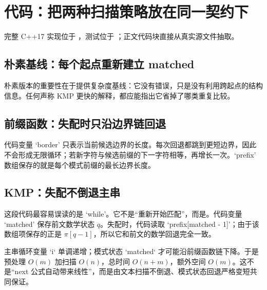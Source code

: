 \documentclass[UTF8,fontset=none,11pt,a4paper]{ctexart}
\begin{document}
\section{代码：把两种扫描策略放在同一契约下}
完整 C++17 实现位于 ，测试位于 ；正文代码块直接从真实源文件抽取。

\subsection{朴素基线：每个起点重新建立 matched}


朴素版本的重要性在于提供复杂度基线：它没有错误，只是没有利用跨起点的结构信息。任何声称 KMP 更快的解释，都应能指出它省掉了哪类重复比较。

\subsection{前缀函数：失配时只沿边界链回退}


代码变量 `border' 只表示当前候选边界的长度。每次回退都跳到更短边界，因此不会形成无限循环；若新字符与候选前缀的下一字符相等，再增长一次。`prefix' 数组保存的就是每个模式前缀的最长边界长度。

\subsection{KMP：失配不倒退主串}


这段代码最容易误读的是 `while'。它不是“重新开始匹配”，而是。代码变量 `matched' 保存前文数学状态 $q$。失配时，代码读取 `prefix[matched - 1]'；由于该数组项保存的正是 $\pi[q-1]$，所以它和前文的数学回退完全一致。

主串循环变量 `i` 单调递增；模式状态 `matched` 才可能沿前缀函数链下降。于是预处理 $O(m)$ 加扫描 $O(n)$，总时间 $O(n+m)$，额外空间 $O(m)$。这不是“next 公式自动带来线性”，而是由文本扫描不倒退、模式状态回退严格变短共同保证。
\end{document}
